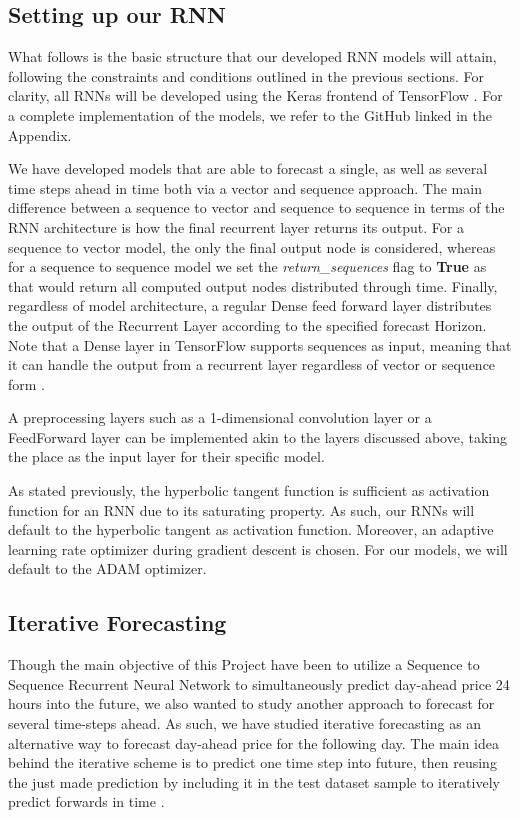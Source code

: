 \documentclass
[twocolumn,
secnumarabic,
nobibnotes,
aps,
prl,
reprint,
groupedaddress,
amsmath,
amssymb,
]{revtex4-2}
\begin{document}
\subsection{Setting up our RNN}
What follows is the basic structure that our developed RNN models will attain, following the constraints and conditions outlined in the previous sections. For clarity, all RNNs will be developed using the Keras frontend of TensorFlow \cite{tensorflow2015-whitepaper}. For a complete implementation of the models, we refer to the GitHub linked in the Appendix. 

We have developed models that are able to forecast a single, as well as several time steps ahead in time both via a vector and sequence approach. The main difference between a sequence to vector and sequence to sequence in terms of the RNN architecture is how the final recurrent layer returns its output. For a sequence to vector model, the only the final output node is considered, whereas for a sequence to sequence model we set the \textit{return\_sequences} flag to \textbf{True} as that would return all computed output nodes distributed through time. Finally, regardless of model architecture, a regular Dense feed forward layer distributes the output of the Recurrent Layer according to the specified forecast Horizon. Note that a Dense layer in TensorFlow supports sequences as input, meaning that it can handle the output from a recurrent layer regardless of vector or sequence form \cite{Geron2019}. 

A preprocessing layers such as a 1-dimensional convolution layer or a FeedForward layer can be implemented akin to the layers discussed above, taking the place as the input layer for their specific model.

As stated previously, the hyperbolic tangent function is sufficient as activation function for an RNN due to its saturating property. As such, our RNNs will default to the hyperbolic tangent as activation function. Moreover, an adaptive learning rate optimizer during gradient descent is chosen. For our models, we will default to the ADAM optimizer.

\subsection{Iterative Forecasting}
Though the main objective of this Project have been to utilize a Sequence to Sequence Recurrent Neural Network to simultaneously predict day-ahead price 24 hours into the future, we also wanted to study another approach to forecast for several time-steps ahead. As such, we have studied iterative forecasting as an alternative way to forecast day-ahead price for the following day. The main idea behind the iterative scheme is to predict one time step into future, then reusing the just made prediction by including it in the test dataset sample to iteratively predict forwards in time \cite{Geron2019}.
\end{document}

